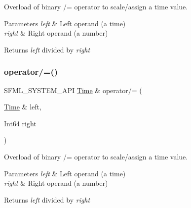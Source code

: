 Overload of binary /= operator to scale/assign a time value. 


\begin{DoxyParams}{Parameters}
{\em left} & Left operand (a time) \\
\hline
{\em right} & Right operand (a number)\\
\hline
\end{DoxyParams}
\begin{DoxyReturn}{Returns}
{\itshape left} divided by {\itshape right} \begin{DoxyVerb}\end{DoxyVerb}
 
\end{DoxyReturn}
\mbox{\label{classsf_1_1_time_ad51871e3db77def834ae8688e64504ff}} 
\subsubsection{\texorpdfstring{operator/=()}{operator/=()}\hspace{0.1cm}{\footnotesize\ttfamily [2/2]}}
{\footnotesize\ttfamily S\+F\+M\+L\+\_\+\+S\+Y\+S\+T\+E\+M\+\_\+\+A\+PI \mbox{\hyperlink{classsf_1_1_time}{Time}} \& operator/= (\begin{DoxyParamCaption}\item[{\mbox{\hyperlink{classsf_1_1_time}{Time}} \&}]{left,  }\item[{Int64}]{right }\end{DoxyParamCaption})\hspace{0.3cm}{\ttfamily [related]}}



Overload of binary /= operator to scale/assign a time value. 


\begin{DoxyParams}{Parameters}
{\em left} & Left operand (a time) \\
\hline
{\em right} & Right operand (a number)\\
\hline
\end{DoxyParams}
\begin{DoxyReturn}{Returns}
{\itshape left} divided by {\itshape right} \begin{DoxyVerb}\end{DoxyVerb}
 
\end{DoxyReturn}
\mbox{\label{classsf_1_1_time_ac222933174ddcff5d14c3ac7d1020d54}} 
